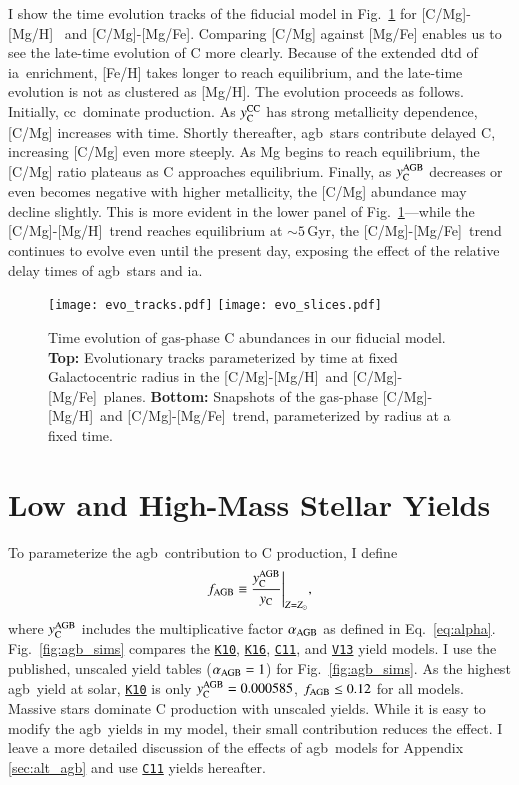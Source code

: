 \documentclass[12pt,oneside,letterpaper]{report}
\newcommand{\cc}{\gls{cc}}
\newcommand{\agb}{\gls{agb}}
\newcommand{\ia}{\gls{ia}}
\newcommand{\cxi}{\texttt{\hyperlink{C11}{C11}}}
\newcommand{\kx}{\texttt{\hyperlink{K10}{K10}}}
\newcommand{\kxvi}{\texttt{\hyperlink{K16}{K16}}}
\newcommand{\vxiii}{\texttt{\hyperlink{V13}{V13}}}
\newcommand{\caah}{[C/Mg]-[Mg/H]}
\newcommand{\caafe}{[C/Mg]-[Mg/Fe]}
\newcommand{\Ycc}{\ensuremath{y_{\rm C}^{\rm CC}}}
\newcommand{\Ycagb}{\ensuremath{y_{\rm C}^{\rm AGB}}}
\newcommand{\Yct}{\ensuremath{y_{\rm C}}}
\newcommand{\about}[1]{${\sim} #1$}
\begin{document}
I show the time evolution tracks of the fiducial model in Fig.~\ref{fig:c_evo} for \caah~ and \caafe. Comparing [C/Mg] against [Mg/Fe] enables us to see the late-time evolution of C more clearly. Because of the extended \gls{dtd} of \ia\ enrichment, [Fe/H] takes longer to reach equilibrium, and the late-time evolution is not as clustered as [Mg/H].
The evolution proceeds as follows.
Initially, \cc\ dominate production. As $\Ycc$ has strong metallicity dependence, [C/Mg] increases with time. Shortly thereafter, \agb\ stars contribute delayed C, increasing [C/Mg] even more steeply. As Mg begins to reach equilibrium, the [C/Mg] ratio plateaus as C approaches equilibrium. Finally, as $\Ycagb$ decreases or even becomes negative with higher metallicity, the [C/Mg] abundance may decline slightly. 
This is more evident in the lower panel of Fig.~\ref{fig:c_evo}---while the \caah\ trend reaches equilibrium at \about{5}\,Gyr, the \caafe\ trend continues to evolve even until the present day, exposing the effect of the relative delay times of \agb\ stars and \ia.


\begin{figure}[htp]
\centering
\texttt{[image: evo\_tracks.pdf]}
\texttt{[image: evo\_slices.pdf]}
\caption[Carbon Chemical Evolution Tracks]{
    Time evolution of gas-phase C abundances in our fiducial model.
    {\bf Top:} Evolutionary tracks parameterized by time at fixed Galactocentric radius in the \caah\ and \caafe\ planes. 
    {\bf Bottom:} Snapshots of the gas-phase \caah\ and \caafe\ trend, parameterized by radius at a fixed time.
}
\label{fig:c_evo}
\end{figure}

\section{Low and High-Mass Stellar Yields}\label{sec:f-z-models}

To parameterize the \agb\ contribution to C production, I define 
\begin{equation}\label{eq:f_agb}
    f_{\rm AGB} \equiv \frac{\Ycagb}{\Yct}\Bigg\vert_{Z=Z_\odot},
\end{equation}
where  $\Ycagb$ includes the multiplicative factor $\alpha_{\rm AGB}$ as defined in Eq.~\ref{eq:alpha}.
Fig.~\ref{fig:agb_sims} compares the \kx{}, \kxvi{}, \cxi{}, and \vxiii{} yield models. I use the published, unscaled yield tables ($\alpha_{\rm AGB}=1$) for Fig.~\ref{fig:agb_sims}. As the highest \agb\ yield at solar, \kx{} is only $\Ycagb=0.000585$, $f_{\rm AGB} \leq 0.12$ for all models. Massive stars dominate C production with unscaled yields.  While it is easy to modify the \agb\ yields in my model, their small contribution reduces the effect. I leave a more detailed discussion of the effects of \agb\ models for Appendix \ref{sec:alt_agb} and use \cxi{} yields hereafter.
\end{document}
